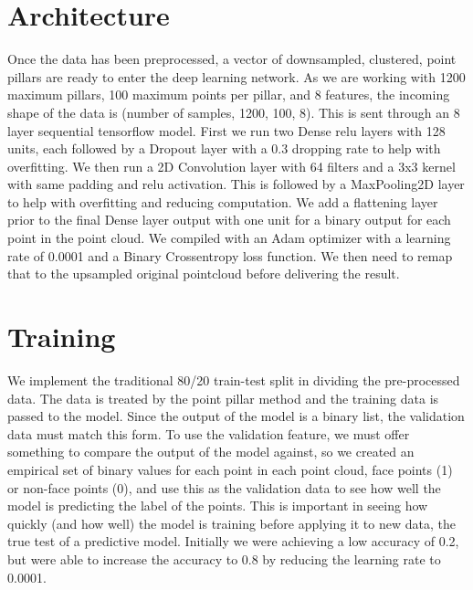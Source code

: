 \documentclass{article}
\begin{document}
\section{Architecture}
Once the data has been preprocessed, a vector of downsampled, clustered, point pillars are ready to enter the deep learning network. As we are working with 1200 maximum pillars, 100 maximum points per pillar, and 8 features, the incoming shape of the data is (number of samples, 1200, 100, 8). This is sent through an 8 layer sequential tensorflow model. First we run two Dense relu layers with 128 units, each followed by a Dropout layer with a 0.3 dropping rate to help with overfitting. We then run a 2D Convolution layer with 64 filters and a 3x3 kernel with same padding and relu activation. This is followed by a MaxPooling2D layer to help with overfitting and reducing computation. We add a flattening layer prior to the final Dense layer output with one unit for a binary output for each point in the point cloud. We compiled with an Adam optimizer with a learning rate of 0.0001 and a Binary Crossentropy loss function. We then need to remap that to the upsampled original pointcloud before delivering the result. 
\section{Training}
We implement the traditional 80/20 train-test split in dividing the pre-processed data. The data is treated by the point pillar method and the training data is passed to the model. Since the output of the model is a binary list, the validation data must match this form. To use the validation feature, we must offer something to compare the output of the model against, so we created an empirical set of binary values for each point in each point cloud, face points (1) or non-face points (0), and use this as the validation data to see how well the model is predicting the label of the points. This is important in seeing how quickly (and how well) the model is training before applying it to new data, the true test of a predictive model. Initially we were achieving a low accuracy of 0.2, but were able to increase the accuracy to 0.8 by reducing the learning rate to 0.0001. 
\end{document}
